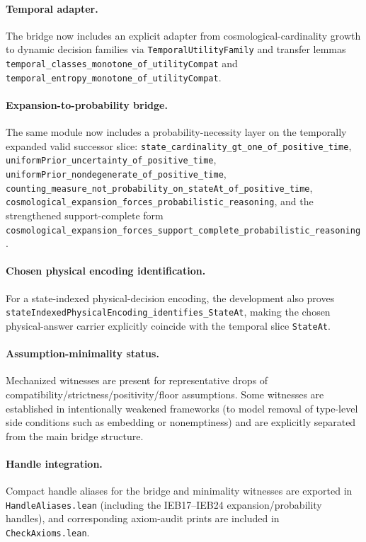 \paragraph{Temporal adapter.}
The bridge now includes an explicit adapter from cosmological-cardinality growth to dynamic decision families via
\texttt{TemporalUtilityFamily} and transfer lemmas
\texttt{temporal\_classes\_monotone\_of\_utilityCompat} and
\texttt{temporal\_entropy\_monotone\_of\_utilityCompat}.

\paragraph{Expansion-to-probability bridge.}
The same module now includes a probability-necessity layer on the temporally
expanded valid successor slice: \texttt{state\_cardinality\_gt\_one\_of\_positive\_time},
\texttt{uniformPrior\_uncertainty\_of\_positive\_time},
\texttt{uniformPrior\_nondegenerate\_of\_positive\_time},
\texttt{counting\_measure\_not\_probability\_on\_stateAt\_of\_positive\_time},
\texttt{cosmological\_expansion\_forces\_probabilistic\_reasoning}, and the
strengthened support-complete form
\texttt{cosmological\_expansion\_forces\_support\_complete\_probabilistic\_reasoning}.

\paragraph{Chosen physical encoding identification.}
For a state-indexed physical-decision encoding, the development also proves
\texttt{stateIndexedPhysicalEncoding\_identifies\_StateAt}, making the chosen
physical-answer carrier explicitly coincide with the temporal slice
\texttt{StateAt}.

\paragraph{Assumption-minimality status.}
Mechanized witnesses are present for representative drops of
compatibility/strictness/positivity/floor assumptions.
Some witnesses are established in intentionally weakened frameworks
(to model removal of type-level side conditions such as embedding or nonemptiness)
and are explicitly separated from the main bridge structure.

\paragraph{Handle integration.}
Compact handle aliases for the bridge and minimality witnesses are exported in
\texttt{HandleAliases.lean} (including the IEB17--IEB24 expansion/probability handles), and corresponding axiom-audit prints are included in
\texttt{CheckAxioms.lean}.


